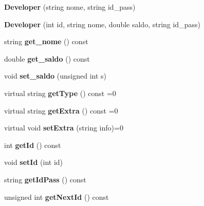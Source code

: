 \begin{DoxyCompactItemize}
\item 
\hypertarget{class_developer_abc9b3e48c4a74a074a9a236a58cd76d4}{{\bfseries Developer} (string nome, string id\+\_\+pass)}\label{class_developer_abc9b3e48c4a74a074a9a236a58cd76d4}

\item 
\hypertarget{class_developer_a6db6c9b58043644f773bd39cf8d0207a}{{\bfseries Developer} (int id, string nome, double saldo, string id\+\_\+pass)}\label{class_developer_a6db6c9b58043644f773bd39cf8d0207a}

\item 
\hypertarget{class_developer_a1ef6280910148ba856bc81719a84ac4c}{string {\bfseries get\+\_\+nome} () const }\label{class_developer_a1ef6280910148ba856bc81719a84ac4c}

\item 
\hypertarget{class_developer_a6fc9217c3f0c04a9cd56916f2e18831a}{double {\bfseries get\+\_\+saldo} () const }\label{class_developer_a6fc9217c3f0c04a9cd56916f2e18831a}

\item 
\hypertarget{class_developer_af3fb1500edd115d29d7b707ece1cace2}{void {\bfseries set\+\_\+saldo} (unsigned int s)}\label{class_developer_af3fb1500edd115d29d7b707ece1cace2}

\item 
\hypertarget{class_developer_aeb475466479de236692d58dfde6ac191}{virtual string {\bfseries get\+Type} () const =0}\label{class_developer_aeb475466479de236692d58dfde6ac191}

\item 
\hypertarget{class_developer_a38d348d3bb05d3505222bee95c29b2f5}{virtual string {\bfseries get\+Extra} () const =0}\label{class_developer_a38d348d3bb05d3505222bee95c29b2f5}

\item 
\hypertarget{class_developer_affa6ed0c90caf781a20d6fb32940f092}{virtual void {\bfseries set\+Extra} (string info)=0}\label{class_developer_affa6ed0c90caf781a20d6fb32940f092}

\item 
\hypertarget{class_developer_a62488b1ca4ddd82fc0797d3de0123bde}{int {\bfseries get\+Id} () const }\label{class_developer_a62488b1ca4ddd82fc0797d3de0123bde}

\item 
\hypertarget{class_developer_aa84da30abf0b1db518d62825f407c520}{void {\bfseries set\+Id} (int id)}\label{class_developer_aa84da30abf0b1db518d62825f407c520}

\item 
\hypertarget{class_developer_a8e5fdafcd4f78c1ea913e2dc09086caa}{string {\bfseries get\+Id\+Pass} () const }\label{class_developer_a8e5fdafcd4f78c1ea913e2dc09086caa}

\item 
\hypertarget{class_developer_a89801e2863c0548f539beb3077e4f6fc}{unsigned int {\bfseries get\+Next\+Id} () const }\label{class_developer_a89801e2863c0548f539beb3077e4f6fc}

\end{DoxyCompactItemize}
